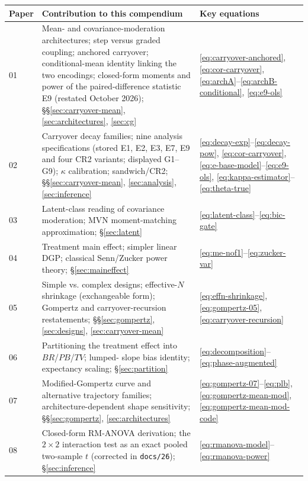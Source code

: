 \documentclass[11pt]{article}
\newcommand{\code}[1]{\texttt{#1}}
\begin{document}
\begin{longtable}{@{}p{2.3cm}p{9.5cm}p{2.3cm}@{}}
\toprule
Paper & Contribution to this compendium & Key equations \\
\midrule
\endhead
01 & Mean- and covariance-moderation architectures; step versus graded
  coupling; anchored carryover; conditional-mean identity linking the
  two encodings; closed-form moments and power of the paired-difference
  statistic E9 (restated October 2026); \S\S\ref{sec:carryover-mean},
  \ref{sec:architectures}, \ref{sec:cg} & \eqref{eq:carryover-anchored},
  \eqref{eq:cor-carryover}, \eqref{eq:archA}--\eqref{eq:archB-conditional},
  \eqref{eq:e9-ols} \\
02 & Carryover decay families; nine analysis specifications (stored
  E1, E2, E3, E7, E9 and four CR2 variants; displayed G1--G9);
  $\kappa$ calibration; sandwich/CR2; \S\S\ref{sec:carryover-mean},
  \ref{sec:analysis}, \ref{sec:inference} & \eqref{eq:decay-exp}--\eqref{eq:decay-pow},
  \eqref{eq:cor-carryover}, \eqref{eq:e-base-model}--\eqref{eq:e9-ols},
  \eqref{eq:kappa-estimator}--\eqref{eq:theta-true} \\
03 & Latent-class reading of covariance moderation; MVN moment-matching
  approximation; \S\ref{sec:latent} & \eqref{eq:latent-class}--\eqref{eq:bic-gate} \\
04 & Treatment main effect; simpler linear DGP; classical Senn/Zucker
  power theory; \S\ref{sec:maineffect} & \eqref{eq:me-nof1}--\eqref{eq:zucker-var} \\
05 & Simple vs. complex designs; effective-$N$ shrinkage
  (exchangeable form); Gompertz and carryover-recursion restatements;
  \S\S\ref{sec:gompertz}, \ref{sec:designs}, \ref{sec:carryover-mean} & \eqref{eq:effn-shrinkage}, \eqref{eq:gompertz-05}, \eqref{eq:carryover-recursion} \\
06 & Partitioning the treatment effect into $BR$/$PB$/$TV$; lumped-
  slope bias identity; expectancy scaling; \S\ref{sec:partition} & \eqref{eq:decomposition}--\eqref{eq:phase-augmented} \\
07 & Modified-Gompertz curve and alternative trajectory families;
  architecture-dependent shape sensitivity; \S\S\ref{sec:gompertz},
  \ref{sec:architectures} & \eqref{eq:gompertz-07}--\eqref{eq:plb},
  \eqref{eq:gompertz-mean-mod}, \eqref{eq:gompertz-mean-mod-code} \\
08 & Closed-form RM-ANOVA derivation; the $2\times2$ interaction test
  as an exact pooled two-sample $t$ (corrected in \code{docs/26});
  \S\ref{sec:inference} & \eqref{eq:rmanova-model}--\eqref{eq:rmanova-power} \\

\end{longtable}
\end{document}
